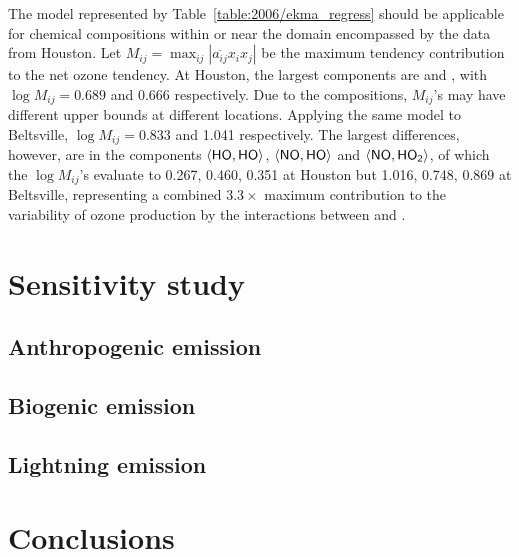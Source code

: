 The model represented by Table~\ref{table:2006/ekma_regress} should be applicable for chemical compositions within or near the domain encompassed by
the data from Houston. Let $M_{ij}=\max_{ij}|\overline{a_{ij}}x_ix_j|$ be the maximum tendency contribution to the net ozone tendency. At Houston, the
largest components are  and , with $\log M_{ij}=0.689$ and 0.666 respectively. Due to the compositions, $M_{ij}$'s may have different
upper bounds at different locations. Applying the same model to Beltsville, $\log M_{ij}=0.833$ and 1.041 respectively. The largest differences, however, are in
the components $\langle\chem{HO},\chem{HO}\rangle$, $\langle\chem{NO},\chem{HO}\rangle$ and $\langle\chem{NO},\chem{HO_2}\rangle$, of which the $\log
M_{ij}$'s evaluate to 0.267, 0.460, 0.351 at Houston but 1.016, 0.748, 0.869 at Beltsville, representing a combined $3.3\times$ maximum contribution to the
variability of ozone production by the interactions between  and .


\section{Sensitivity study}\label{sec:2006/sens}
\subsection{Anthropogenic emission}\label{ssec:2006/sens/anthrop}
\subsection{Biogenic emission}\label{ssec:2006/sens/bio}
\subsection{Lightning emission}\label{ssec:2006/sens/lnox}

\section{Conclusions}\label{sec:2006/conslusion}
